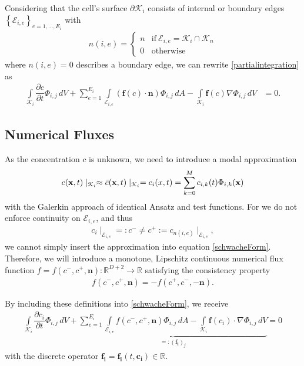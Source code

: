 		Considering that the cell's surface $\partial \mathcal{K}_i$ consists of internal or boundary edges $\left\{\mathcal{E}_{i,e}\right\}_{e = 1,...,E_i}$ with
				\begin{align}
				n(i,e) =  
				\begin{cases}
				n & \text{if} ~ \mathcal{E}_{i,e} = \mathcal{K}_i \cap \mathcal{K}_n \\
				0 &\text{otherwise}
				\end{cases}
				\end{align}
		where $n(i,e)=0$ describes a boundary edge, we can rewrite \eqref{partialintegration} as
		\begin{align}
				\int\limits_{\mathcal{K}_i} \dfrac{\partial c}{\partial t}\Phi_{i,j} \, dV +
				\sum_{e=1}^{E_i}\int\limits_{\mathcal{E}_{i,e}} \left(\boldsymbol{f} \left( c \right) \cdot \boldsymbol{n} \right)\Phi_{i,j} \, dA
				- \int\limits_{\mathcal{K}_i} \boldsymbol{f}\left(c\right)\nabla\Phi_{i,j} \, dV &= 0.
				\label{schwacheForm}
		\end{align}
		\subsection{Numerical Fluxes}
		
		As the concentration $c$ is unknown, we need to introduce a modal approximation
		\begin{align}
			c(\mathbf{x} , t)\mid _{\mathcal{K}_i} \approx \bar{c} (\mathbf{x} , t)\mid _{\mathcal{K}_i} = c_i (\boldmath{x} , t) = \sum_{k = 0}^{M}c_{i,k}(t) \Phi_{i,k}(\mathbf{x})
		\end{align}
		with the Galerkin approach of identical Ansatz and test functions. 
		For we do not enforce continuity on $\mathcal{E}_{i,e}$, and thus 
		\begin{align}
			c_i \mid_{\mathcal{E}_{i,e}}=: c^- \neq c^+ := c_{n(i,e)} \mid_{\mathcal{E}_{i,e}},
		\end{align}
		we cannot simply insert the approximation into equation \eqref{schwacheForm}.
		Therefore, we will introduce a monotone, Lipschitz continuous numerical flux function $f = f(c^-, c^+, \mathbf{n}):\mathbb{R}^{D+2}\rightarrow\mathbb{R}$ satisfying the consistency property
		\begin{align}
			f(c^-, c^+, \mathbf{n}) = - f(c^+, c^-, -\mathbf{n}).
		\end{align}
		
		By including these definitions into \eqref{schwacheForm}, we receive
		\begin{align}
			\int\limits_{\mathcal{K}_i} \dfrac{\partial c_i}{\partial t}\Phi_{i,j} \, dV +
			\underbrace{\sum_{e=1}^{E_i}\int\limits_{\mathcal{E}_{i,e}} f \left( c^-, c^+, \mathbf{n} \right) \Phi_{i,j} \, dA - \int\limits_{\mathcal{K}_i} \boldsymbol{f}\left(c_i\right) \cdot \nabla\Phi_{i,j} \, dV}_{=:(\mathbf{f_i})_j} = 0
			\label{schwacheFormFlux}
		\end{align}
		with the discrete operator $\mathbf{f_i}=\mathbf{f_i}(t, \mathbf{c_i})\in\mathbb{R}$.
		
